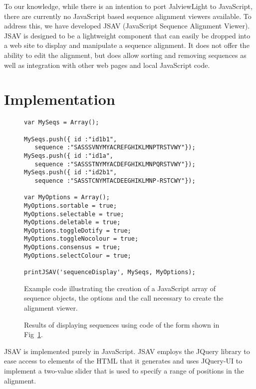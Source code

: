 \documentclass[a4]{bioinfo}
\begin{document}
To our knowledge, while there is an intention to port JalviewLight to
JavaScript, there are currently no JavaScript based sequence alignment
viewers available. To address this, we have developed JSAV (JavaScript
Sequence Alignment Viewer). JSAV is designed to be a lightweight
component that can easily be dropped into a web site to display and
manipulate a sequence alignment. It does not offer the ability to edit
the alignment, but does allow sorting and removing sequences as well
as integration with other web pages and local JavaScript code.



\section{Implementation}

\begin{figure}
\footnotesize
\begin{verbatim}
var MySeqs = Array();

MySeqs.push({ id :"id1b1",  
   sequence :"SASSSVNYMYACREFGHIKLMNPTRSTVWY"});
MySeqs.push({ id :"id1a",   
   sequence :"SASSSTNYMYACDEFGHIKLMNPQRSTVWY"});
MySeqs.push({ id :"id2b1",  
   sequence :"SASSTCNYMTACDEEGHIKLMNP-RSTCWY"});

var MyOptions = Array();
MyOptions.sortable = true;
MyOptions.selectable = true;
MyOptions.deletable = true;
MyOptions.toggleDotify = true;
MyOptions.toggleNocolour = true;
MyOptions.consensus = true;
MyOptions.selectColour = true;

printJSAV('sequenceDisplay', MySeqs, MyOptions);
\end{verbatim}
\caption{\label{fig:code}Example code illustrating the creation of a
JavaScript array of sequence objects, the options and the call
necessary to create the alignment viewer.}
\end{figure}

\begin{figure}
\caption{\label{fig:demo}Results of displaying sequences using 
  code of the form shown in Fig~\ref{fig:code}.}
\end{figure}

JSAV is implemented purely in JavaScript. JSAV employs the JQuery
library to ease access to elements of the HTML that it generates and
uses JQuery-UI to implement a two-value slider that is used to specify
a range of positions in the alignment.
\end{document}
